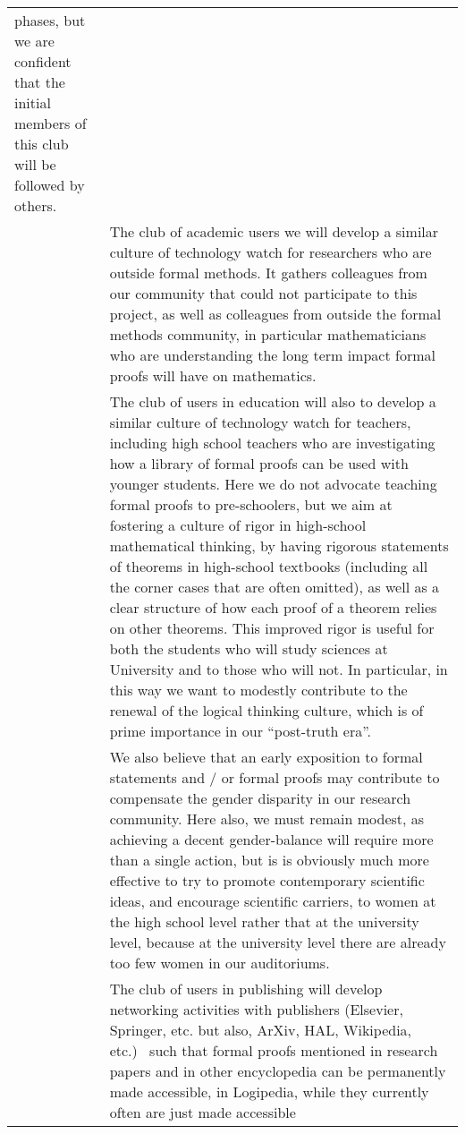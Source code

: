 \begin{longtable*}{|p{0.2\textwidth}|p{0.75\textwidth}|}
phases, but we are confident that the initial members of this club
will be followed by others.\\ 
&
\hspace{0.4cm}
The club of academic users
we will develop a similar culture of technology watch for
researchers who are outside formal methods.  
It gathers colleagues from our community that could not participate to
this project, as well as colleagues from outside the formal methods
community, in particular mathematicians who are understanding
the long term impact formal proofs will have on mathematics.\\
&
\hspace{0.4cm}
The club of users in education
will also to develop a similar culture of
technology watch for teachers, including high school teachers who are
investigating how a library of formal proofs can be used with younger
students. Here we do not advocate teaching formal proofs to pre-schoolers, but
we aim at fostering a culture of rigor in high-school mathematical
thinking, by having rigorous statements of theorems in high-school
textbooks (including all the corner cases that are often omitted), as
well as a clear structure of how each proof of a theorem relies on
other theorems. This improved rigor is useful for both the students
who will study sciences at University and to those who will not. In
particular, in this way we want to modestly contribute to the renewal
of the logical thinking culture, which is of prime importance in our
``post-truth era''.\\
&
\hspace{0.4cm}
We also believe that an early exposition to formal statements and / or
formal proofs may contribute to compensate the gender disparity
in our research community. Here also, we must remain modest, as
achieving a decent gender-balance will require more than a single
action, but is is obviously much more effective to try to promote
contemporary scientific ideas, and encourage scientific carriers, to
women at the high school level rather that at the university level,
because at the university level there are already too few women in
our auditoriums.\\
&
\hspace{0.4cm}
The club of users in publishing 
will develop networking activities with publishers
(Elsevier, Springer, etc. but also, ArXiv, HAL, Wikipedia, etc.)~
such that formal proofs mentioned in research papers and in
other encyclopedia can be permanently made accessible, in Logipedia, 
while they currently often are just made accessible

\end{longtable*}

